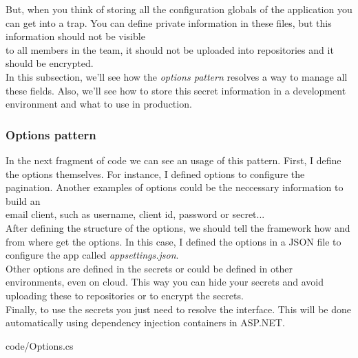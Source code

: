         But, when you think of storing all the configuration globals of the application you can get into a trap. You can define private information in these files, but this information should not be visible \\
        to all members in the team, it should not be uploaded into repositories and it should be encrypted. \\

        In this subsection, we'll see how the \textit{options pattern} resolves a way to manage all these fields. Also, we'll see how to store this secret information in a development environment and what to use in production. \\

        \subsubsection{Options pattern}
            In the next fragment of code we can see an usage of this pattern. First, I define the options themselves. For instance, I defined options to configure the pagination. Another examples of options could be the neccessary information to build an \\
            email client, such as username, client id, password or secret... \\
            
            After defining the structure of the options, we should tell the framework how and from where get the options. In this case, I defined the options in a JSON file to configure the app called \textit{appsettings.json}. \\
            Other options are defined in the secrets or could be defined in other environments, even on cloud. This way you can hide your secrets and avoid uploading these to repositories or to encrypt the secrets. \\

            Finally, to use the secrets you just need to resolve the interface. This will be done automatically using dependency injection containers in ASP.NET.
                
                {code/Options.cs}

